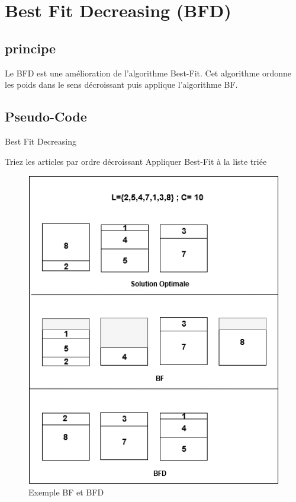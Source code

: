 \documentclass[class=article, crop=false]{standalone}
\begin{document}
\section{Best Fit Decreasing (BFD)}
\subsection{principe}
Le BFD est une amélioration de l’algorithme Best-Fit. Cet algorithme ordonne les poids dans le sens décroissant puis applique l’algorithme BF.

\subsection{Pseudo-Code}

\begin{algorithm}
    \caption{Best Fit Decreasing }
    \begin{algorithmic}
        \STATE Triez les articles par ordre décroissant
        \STATE Appliquer Best-Fit à la liste triée 
    \end{algorithmic}
\end{algorithm}


\begin{figure}[H]
    \includegraphics[width=\linewidth]{../figures/BF BFD.png}
    \caption{Exemple BF et BFD}
\end{figure}
\newpage
\end{document}
